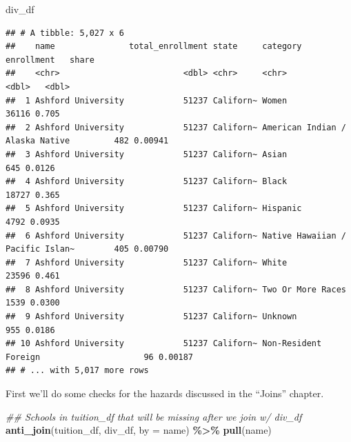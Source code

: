 \documentclass[
]{article}
\newenvironment{Shaded}{\begin{snugshade}}{\end{snugshade}}
\newcommand{\CommentTok}[1]{\textcolor[rgb]{0.56,0.35,0.01}{\textit{#1}}}
\newcommand{\DataTypeTok}[1]{\textcolor[rgb]{0.13,0.29,0.53}{#1}}
\newcommand{\KeywordTok}[1]{\textcolor[rgb]{0.13,0.29,0.53}{\textbf{#1}}}
\newcommand{\NormalTok}[1]{#1}
\newcommand{\OperatorTok}[1]{\textcolor[rgb]{0.81,0.36,0.00}{\textbf{#1}}}
\newcommand{\StringTok}[1]{\textcolor[rgb]{0.31,0.60,0.02}{#1}}
\begin{document}
\begin{Shaded}
\begin{Highlighting}[]
\NormalTok{div\_df}
\end{Highlighting}
\end{Shaded}

\begin{verbatim}
## # A tibble: 5,027 x 6
##    name               total_enrollment state     category                         enrollment   share
##    <chr>                         <dbl> <chr>     <chr>                                 <dbl>   <dbl>
##  1 Ashford University            51237 Californ~ Women                                 36116 0.705  
##  2 Ashford University            51237 Californ~ American Indian / Alaska Native         482 0.00941
##  3 Ashford University            51237 Californ~ Asian                                   645 0.0126 
##  4 Ashford University            51237 Californ~ Black                                 18727 0.365  
##  5 Ashford University            51237 Californ~ Hispanic                               4792 0.0935 
##  6 Ashford University            51237 Californ~ Native Hawaiian / Pacific Islan~        405 0.00790
##  7 Ashford University            51237 Californ~ White                                 23596 0.461  
##  8 Ashford University            51237 Californ~ Two Or More Races                      1539 0.0300 
##  9 Ashford University            51237 Californ~ Unknown                                 955 0.0186 
## 10 Ashford University            51237 Californ~ Non-Resident Foreign                     96 0.00187
## # ... with 5,017 more rows
\end{verbatim}

First we'll do some checks for the hazards discussed in the ``Joins'' chapter.

\begin{Shaded}
\begin{Highlighting}[]
\CommentTok{\#\# Schools in tuition\_df that will be missing after we join w/ div\_df}
\KeywordTok{anti\_join}\NormalTok{(tuition\_df, div\_df, }\DataTypeTok{by =} \StringTok{\textquotesingle{}name\textquotesingle{}}\NormalTok{) }\OperatorTok{\%\textgreater{}\%}\StringTok{ }
\StringTok{    }\KeywordTok{pull}\NormalTok{(name)}
\end{Highlighting}
\end{Shaded}
\end{document}
